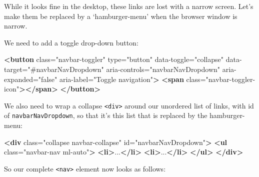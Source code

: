 \documentclass[a4paperpaper,openright]{book}
\newenvironment{Shaded}{}{}
\newcommand{\KeywordTok}[1]{\textcolor[rgb]{0.00,0.44,0.13}{\textbf{#1}}}
\newcommand{\NormalTok}[1]{#1}
\newcommand{\OtherTok}[1]{\textcolor[rgb]{0.00,0.44,0.13}{#1}}
\newcommand{\StringTok}[1]{\textcolor[rgb]{0.25,0.44,0.63}{#1}}
\begin{document}
While it looks fine in the desktop, these links are lost with a narrow
screen. Let's make them be replaced by a `hamburger-menu' when the
browser window is narrow.

We need to add a toggle drop-down button:

\begin{Shaded}
\begin{Highlighting}[]
    \KeywordTok{<button}\OtherTok{ class=}\StringTok{"navbar-toggler"}\OtherTok{ type=}\StringTok{"button"}\OtherTok{ data-toggle=}\StringTok{"collapse"}
\OtherTok{            data-target=}\StringTok{"#navbarNavDropdown"}\OtherTok{ aria-controls=}\StringTok{"navbarNavDropdown"}
\OtherTok{            aria-expanded=}\StringTok{"false"}\OtherTok{ aria-label=}\StringTok{"Toggle navigation"}\KeywordTok{>}
        \KeywordTok{<span}\OtherTok{ class=}\StringTok{"navbar-toggler-icon"}\KeywordTok{></span>}
    \KeywordTok{</button>}
\end{Highlighting}
\end{Shaded}

We also need to wrap a collapse \texttt{\textless{}div\textgreater{}}
around our unordered list of links, with id of
\texttt{navbarNavDropdown}, so that it's this list that is replaced by
the hamburger-menu:

\begin{Shaded}
\begin{Highlighting}[]
    \KeywordTok{<div}\OtherTok{ class=}\StringTok{"collapse navbar-collapse"}\OtherTok{ id=}\StringTok{"navbarNavDropdown"}\KeywordTok{>}
        \KeywordTok{<ul}\OtherTok{ class=}\StringTok{"navbar-nav ml-auto"}\KeywordTok{>}
            \KeywordTok{<li>}\NormalTok{...}\KeywordTok{</li>}
            \KeywordTok{<li>}\NormalTok{...}\KeywordTok{</li>}
        \KeywordTok{</ul>}
    \KeywordTok{</div>}
\end{Highlighting}
\end{Shaded}

So our complete \texttt{\textless{}nav\textgreater{}} element now looks
as follows:
\end{document}
